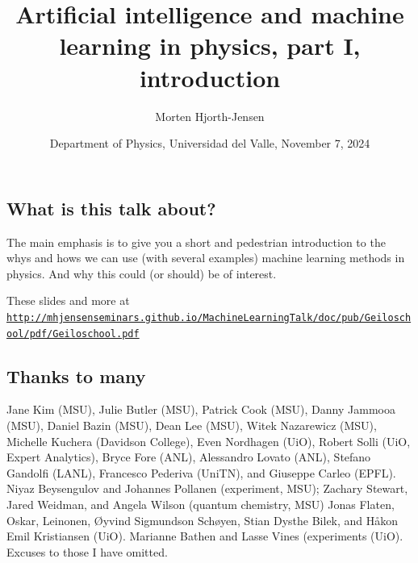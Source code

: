 \documentclass[%
oneside,                 %
final,                   %
10pt]{article}
\begin{document}

\newcommand{\exercisesection}[1]{\subsection*{#1}}






\title{Artificial intelligence and machine learning in physics, part I, introduction }


\author{Morten Hjorth-Jensen}

\date{Department of Physics, Universidad del Valle, November 7, 2024
}

\subsection{What is this talk about?}
\begin{block}{}
The main emphasis is to give you a short and pedestrian introduction to the whys and hows we can use (with several examples) machine learning methods
in physics. And why this could (or should) be of interest. 
\end{block}

\begin{block}{}
These slides and more at \href{{http://mhjensenseminars.github.io/MachineLearningTalk/doc/pub/Geiloschool/pdf/Geiloschool.pdf}}{\nolinkurl{http://mhjensenseminars.github.io/MachineLearningTalk/doc/pub/Geiloschool/pdf/Geiloschool.pdf}}
\end{block}

\subsection{Thanks to many}

Jane Kim (MSU), Julie Butler (MSU), Patrick Cook (MSU), Danny Jammooa (MSU), Daniel Bazin (MSU), Dean Lee (MSU), Witek Nazarewicz (MSU), Michelle Kuchera (Davidson College), Even Nordhagen (UiO), Robert Solli (UiO, Expert Analytics), Bryce Fore (ANL), Alessandro Lovato (ANL), Stefano Gandolfi (LANL), Francesco Pederiva (UniTN), and Giuseppe Carleo (EPFL). 
Niyaz Beysengulov and Johannes Pollanen (experiment, MSU); Zachary Stewart, Jared Weidman, and Angela Wilson (quantum chemistry, MSU)
Jonas Flaten, Oskar, Leinonen, Øyvind Sigmundson Schøyen, Stian Dysthe Bilek, and Håkon Emil Kristiansen (UiO). Marianne Bathen and Lasse Vines (experiments (UiO). Excuses to those I have omitted.
\end{document}
